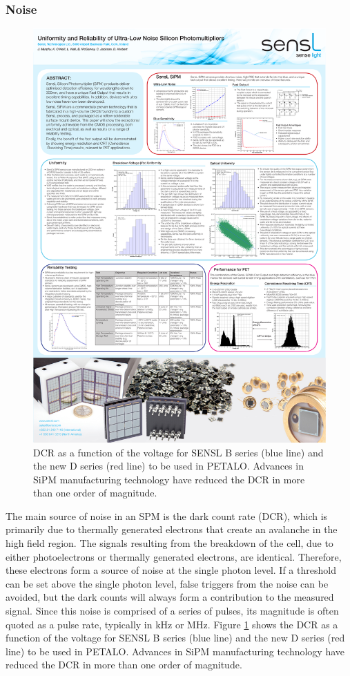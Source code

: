 \subsubsection*{Noise}

\begin{figure}[!bhtp]
	\centering
	\includegraphics[scale=0.9]{img/SiPMDCR.pdf}
	\caption{\label{fig.dcr} DCR as a function of the voltage for SENSL B series (blue line) and the new D series (red line) to be used in PETALO. Advances in SiPM manufacturing technology have reduced the DCR in more than one order of magnitude.}
\end{figure}


The main source of noise in an SPM is the dark count rate (DCR), which is primarily due to thermally generated electrons that create an avalanche in the high field region. The signals resulting from the breakdown of the cell, due to either photoelectrons or thermally generated electrons, are identical. Therefore, these electrons form a source of noise at the single photon level. If a threshold can be set above the single photon level, false triggers from the noise can be avoided, but the dark counts will always form a contribution to the measured signal.
Since this noise is comprised of a series of pulses, its magnitude
is often quoted as a pulse rate, typically in kHz or MHz. Figure \ref{fig.dcr} shows the DCR as a function of the voltage for SENSL B series (blue line) and the new D series (red line) to be used in PETALO. Advances in SiPM manufacturing technology have reduced the DCR in more than one order of magnitude. 

